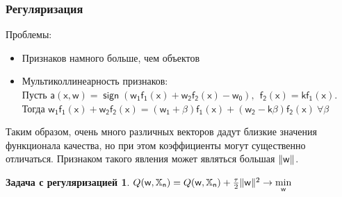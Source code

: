 \documentclass[unicode, notheorems]{beamer}
\newtheorem{task_regul}{Задача с регуляризацией}
\DeclareMathOperator{\sign}{sign}
\begin{document}
%
%
%

\begin{frame}
	\frametitle{Регуляризация}
\alert{Проблемы:}
\begin{itemize}
\item Признаков намного больше, чем объектов
\item {Мультиколлинеарность признаков: \\
Пусть $\mathsf{a(x,w)=\sign (w_1f_1(x)+w_2f_2(x)-w_0),~~ f_2(x)=kf_1(x)}$. \\
Тогда $\mathsf{w_1f_1(x)+w_2f_2(x)=(w_1+\beta)f_1(x)+(w_2-k\beta)f_2(x)~ \forall \beta}$}
\end{itemize}
Таким образом, очень много различных векторов дадут близкие значения функционала качества, но при этом коэффициенты могут существенно отличаться. Признаком такого явления может являться большая $\Arrowvert \mathsf{w} \Arrowvert$. 
\begin{task_regul}
	$Q(\mathsf{w},\mathbb{X}_\mathsf{n})=Q(\mathsf{w},\mathbb{X}_\mathsf{n})+\frac{\tau}{2}\Arrowvert \mathsf{w} \Arrowvert ^2 \to \min \limits_\mathsf{w}$
\end{task_regul}	

\end{frame}
\end{document}
